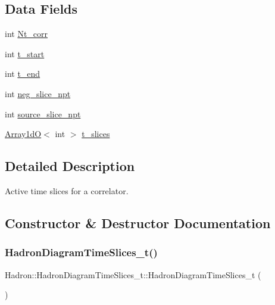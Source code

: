 \subsection*{Data Fields}
\begin{DoxyCompactItemize}
\item 
int \mbox{\hyperlink{structHadron_1_1HadronDiagramTimeSlices__t_ac1d948597af1c4afc74c5fbe6b58e1fc}{Nt\+\_\+corr}}
\item 
int \mbox{\hyperlink{structHadron_1_1HadronDiagramTimeSlices__t_ace776097f7b2bb23862493b7e5621002}{t\+\_\+start}}
\item 
int \mbox{\hyperlink{structHadron_1_1HadronDiagramTimeSlices__t_a677258946704e301f768fb0b629cf1a1}{t\+\_\+end}}
\item 
int \mbox{\hyperlink{structHadron_1_1HadronDiagramTimeSlices__t_a1740529fd16ed90f5ef6080aaf1e93a5}{neg\+\_\+slice\+\_\+npt}}
\item 
int \mbox{\hyperlink{structHadron_1_1HadronDiagramTimeSlices__t_a89cdd4482372015949fd47b0eb69f500}{source\+\_\+slice\+\_\+npt}}
\item 
\mbox{\hyperlink{classADAT_1_1Array1dO}{Array1dO}}$<$ int $>$ \mbox{\hyperlink{structHadron_1_1HadronDiagramTimeSlices__t_a870700ce888c6a61a69bd1bb8b935ac0}{t\+\_\+slices}}
\end{DoxyCompactItemize}


\subsection{Detailed Description}
Active time slices for a correlator. 

\subsection{Constructor \& Destructor Documentation}
\mbox{\label{structHadron_1_1HadronDiagramTimeSlices__t_a2c90aaaf0112e21e3c3f065ac2d32682}} 
\subsubsection{\texorpdfstring{HadronDiagramTimeSlices\_t()}{HadronDiagramTimeSlices\_t()}\hspace{0.1cm}{\footnotesize\ttfamily [1/3]}}
{\footnotesize\ttfamily Hadron\+::\+Hadron\+Diagram\+Time\+Slices\+\_\+t\+::\+Hadron\+Diagram\+Time\+Slices\+\_\+t (\begin{DoxyParamCaption}{ }\end{DoxyParamCaption})\hspace{0.3cm}{\ttfamily [inline]}}

